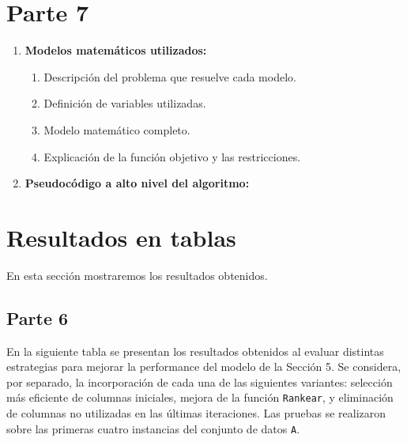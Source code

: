 \documentclass[a4paper,12pt]{article}
\begin{document}
\clearpage

\section{Parte 7}
\label{sec:variante5}

\begin{enumerate}[label=(\alph*), leftmargin=2em]
    \item \textbf{Modelos matemáticos utilizados:}
    \begin{enumerate}[label=\roman*., leftmargin=0.2em]
        \item Descripción del problema que resuelve cada modelo.
        \item Definición de variables utilizadas.
        \item Modelo matemático completo.
        \item Explicación de la función objetivo y las restricciones.
    \end{enumerate}

    \item \textbf{Pseudocódigo a alto nivel del algoritmo:}
\end{enumerate}

\clearpage

\section{Resultados en tablas}
En esta sección mostraremos los resultados obtenidos.

\subsection{Parte 6}
En la siguiente tabla se presentan los resultados obtenidos al evaluar distintas estrategias para mejorar la performance del modelo de la Sección 5. Se considera, por separado, la incorporación de cada una de las siguientes variantes: selección más eficiente de columnas iniciales, mejora de la función \texttt{Rankear}, y eliminación de columnas no utilizadas en las últimas iteraciones. Las pruebas se realizaron sobre las primeras cuatro instancias del conjunto de datos \texttt{A}.
\end{document}
